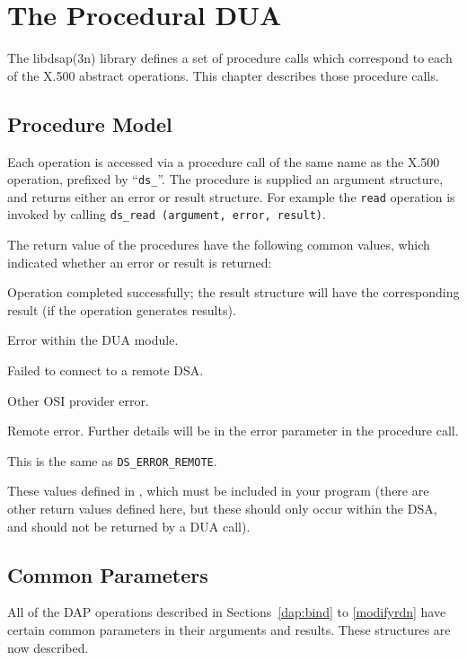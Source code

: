 
\chapter {The Procedural DUA}
\label{DUA:proc}

The \man libdsap(3n) library defines a set of procedure calls which
correspond to each 
of the X.500 abstract operations.
This chapter describes those procedure calls.

\section {Procedure Model}
\label{proc_model}

Each operation is accessed via a procedure call of the same name as the
X.500 operation, prefixed by ``\verb"ds_"''.
The procedure is supplied an argument structure, and returns either an error
or result structure.
For example the \verb"read" operation is invoked by calling
\verb"ds_read (argument, error, result)".

The return value of the procedures have the following common values, which
indicated whether an error or result is returned:
\begin{describe}
\item [\verb"DS\_OK":]        Operation completed successfully; the result
structure will have the corresponding result (if the operation generates
results).
\item [\verb"DS\_ERROR\_LOCAL":] Error within the DUA module.
\item [\verb"DS\_ERROR\_CONNECT":] Failed to connect to a remote DSA.
\item [\verb"DS\_ERROR\_PROVIDER":] Other OSI provider error.
\item [\verb"DS\_ERROR\_REMOTE":] Remote error.  Further details will  
be in the error parameter in the procedure call.
\item [\verb"DS\_X500\_ERROR":] This is the same as \verb"DS_ERROR_REMOTE".
\end{describe}
These values defined in , which must be included
in your program (there are other return values defined here, but these
should only occur within the DSA, and should not be returned by a DUA call).

\section {Common Parameters}
All of the DAP operations described in Sections~\ref{dap:bind} to \ref{modifyrdn}
have certain common parameters in their arguments and results.
These structures are now described.


